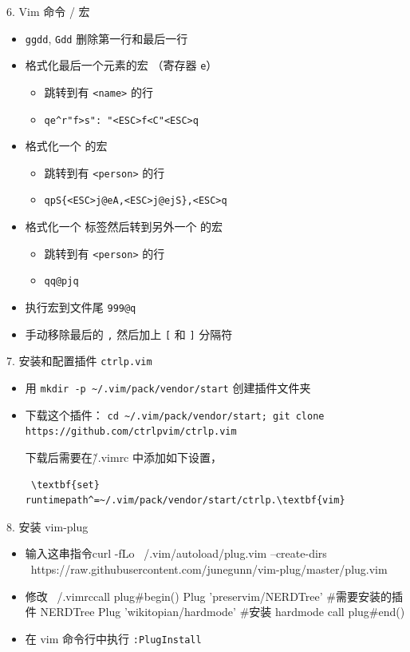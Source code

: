 \documentclass{article}
\begin{document}
6.
Vim 命令 / 宏

\begin{itemize}
    \item \verb|ggdd|, \verb|Gdd| 删除第一行和最后一行
    \item 格式化最后一个元素的宏 （寄存器 \verb|e|）
    \begin{itemize}
        \item 跳转到有 \verb|<name>| 的行
        \item \verb|qe^r"f>s": "<ESC>f<C"<ESC>q|
    \end{itemize}
    \item 格式化一个 的宏
    \begin{itemize}
        \item 跳转到有 \verb|<person>| 的行
        \item \verb|qpS{<ESC>j@eA,<ESC>j@ejS},<ESC>q|
    \end{itemize}
    \item 格式化一个 标签然后转到另外一个 的宏
    \begin{itemize}
        \item 跳转到有 \verb|<person>| 的行
        \item \verb|qq@pjq|
    \end{itemize}
    \item 执行宏到文件尾
\verb|999@q|

    \item 手动移除最后的 \verb|,| 然后加上 \verb|[| 和 \verb|]| 分隔符
\end{itemize}

7.
安装和配置插件 \verb|ctrlp.vim| 


\begin{itemize}
    \item 用 \verb|mkdir -p ~/.vim/pack/vendor/start| 创建插件文件夹
    \item 下载这个插件： \verb|cd ~/.vim/pack/vendor/start; git clone https://github.com/ctrlpvim/ctrlp.vim|

下载后需要在\~/.vimrc 中添加如下设置，

\begin{verbatim}
 \textbf{set} runtimepath^=~/.vim/pack/vendor/start/ctrlp.\textbf{vim} 
\end{verbatim}

\end{itemize}
 
8.
安装 vim-plug 
\begin{itemize}
\item 输入这串指令\newline curl -fLo ~/.vim/autoload/plug.vim --create-dirs \
https://raw.githubusercontent.com/junegunn/vim-plug/master/plug.vim
\item 修改 ~/.vimrc\newline call plug#begin()\newline
 Plug 'preservim/NERDTree' #需要安装的插件 NERDTree\newline
 Plug 'wikitopian/hardmode'  #安装 hardmode\newline
 call plug#end()
 \item 在 vim 命令行中执行 \verb|:PlugInstall| 
\end{itemize}
\end{document}

